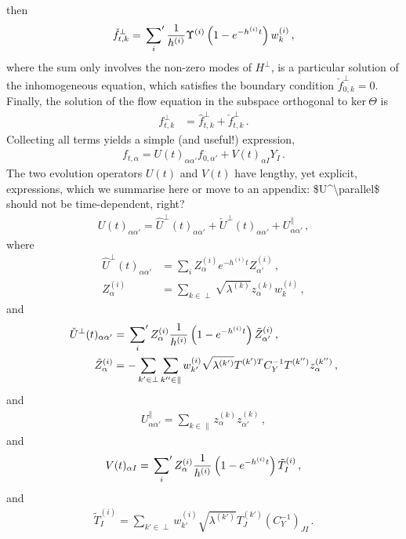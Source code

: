 then
\begin{align}
    \label{eq:PartSol}
    \check{f}^\perp_{t,k} = \sideset{}{'}\sum_{i} \frac{1}{h^{(i)}} \Upsilon^{(i)}
        \left(1 - e^{-h^{(i)}t}\right) w^{(i)}_k\, ,
\end{align}
where the sum only involves the non-zero modes of $H^\perp$,
is a particular solution of the inhomogeneous equation, which satisfies the boundary
condition $\check{f}^{\perp}_{0,k}=0$. Finally, the solution of the flow equation in the subspace orthogonal to
$\text{ker}\ \Theta$ is
\begin{align}
    f^\perp_{t,k}
    \label{eq:FlowSolution}
        &= \hat{f}^\perp_{t,k} + \check{f}^\perp_{t,k}
        \, .
\end{align}
Collecting all terms yields a simple (and useful!) expression,
\begin{align}
    \label{eq:AnalyticSol}
    f_{t,\alpha}
        = U(t)_{\alpha\alpha'} f_{0,\alpha'} + V(t)_{\alpha I} Y_{I}\, .
\end{align}
The two evolution operators $U(t)$ and $V(t)$ have lengthy, yet explicit, expressions, which we
summarise here or move to an appendix: \ac{$U^\parallel$ should not be time-dependent, right?}
\begin{align}
    U(t)_{\alpha\alpha'} = \hat{U}^\perp(t)_{\alpha\alpha'}
        + \check{U}^\perp(t)_{\alpha\alpha'} + U^\parallel_{\alpha\alpha'}\, ,
\end{align}
where
\begin{align}
    \hat{U}^\perp(t)_{\alpha\alpha'}
        &= \sum_i Z^{(i)}_{\alpha} e^{-h^{(i)}t} Z^{(i)}_{\alpha'}\, , \\
    Z^{(i)}_{\alpha}
        &= \sum_{k\in\perp} \sqrt{\lambda^{(k)}} z^{(k)}_\alpha w^{(i)}_{k}\, ,
\end{align}
and
\begin{align}
    \check{U}^\perp(t)_{\alpha\alpha'}
        &= \sideset{}{'}\sum_{i} Z^{(i)}_{\alpha} \frac{1}{h^{(i)}} \left(1 - e^{-h^{(i)}t}\right) \tilde{Z}^{(i)}_{\alpha'}\, , \\
    \tilde{Z}^{(i)}_{\alpha}
        &= -\sum_{k'\in\perp} \sum_{k''\in\parallel} w^{(i)}_{k'} \sqrt{\lambda^{(k')}}
            T^{(k') T} C_Y^{-1} T^{(k'')} z^{(k'')}_{\alpha}\, ,
\end{align}
and
\begin{align}
    U^\parallel_{\alpha\alpha'}
        = \sum_{k\in\parallel} z^{(k)}_\alpha z^{(k)}_{\alpha'} \, ,
\end{align}
and
\begin{align}
    V(t)_{\alpha I} = \sideset{}{'}\sum_{i} Z^{(i)}_{\alpha} \frac{1}{h^{(i)}} \left(1 - e^{-h^{(i)}t}\right)
        \tilde{T}^{(i)}_{I}\, ,
\end{align}
and
\begin{align}
    \tilde{T}^{(i)}_{I} = \sum_{k'\in\perp} w^{(i)}_{k'} \sqrt{\lambda^{(k')}}
        T^{(k')}_J \left(C_Y^{-1}\right)_{JI}\, .
\end{align}

